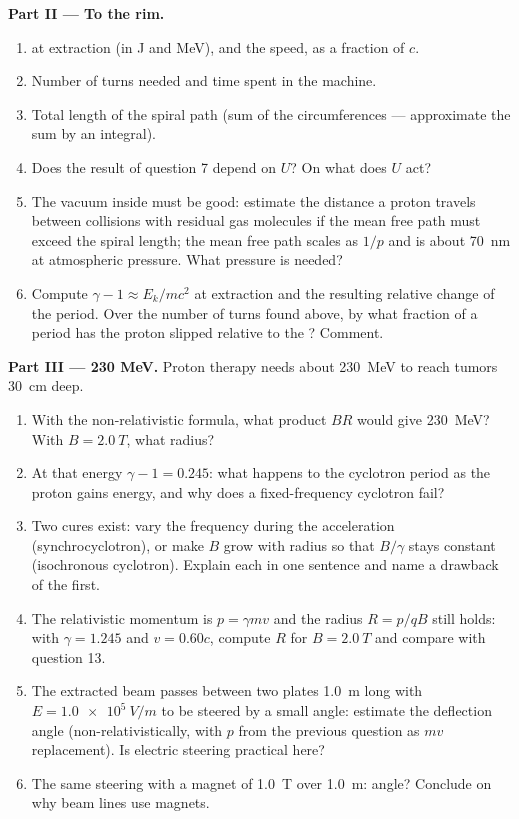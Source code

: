 \begin{problem}
\medskip
\noindent\textbf{Part II --- To the rim.}
\begin{enumerate}[resume]
  \item {} at extraction (in J and MeV), and the speed, as a
        fraction of $c$.
  \item Number of turns needed and time spent in the machine.
  \item Total length of the spiral path (sum of the circumferences ---
        approximate the sum by an integral).
  \item Does the result of question 7 depend on $U$? On what does $U$
        act?
  \item The vacuum inside must be good: estimate the distance a proton
        travels between collisions with residual gas molecules if the
        mean free path must exceed the spiral length; the mean free path
        scales as $1/p$ and is about \qty{70}{nm} at atmospheric
        pressure. What pressure is needed?
  \item Compute $\gamma - 1 \approx E_k/mc^2$ at extraction and the
        resulting relative change of the period. Over the number of
        turns found above, by what fraction of a period has the proton
        slipped relative to the ? Comment.
\end{enumerate}

\medskip
\noindent\textbf{Part III --- 230 MeV.}
Proton therapy needs about \qty{230}{MeV} to reach tumors \qty{30}{cm}
deep.
\begin{enumerate}[resume]
  \item With the non-relativistic formula, what product $BR$ would give
        \qty{230}{MeV}? With $B = \qty{2.0}{T}$, what radius?
  \item At that energy $\gamma - 1 = 0.245$: what happens to the
        cyclotron period as the proton gains energy, and why does a
        fixed-frequency cyclotron fail?
  \item Two cures exist: vary the  frequency during the
        acceleration (synchrocyclotron), or make $B$ grow with radius so
        that $B/\gamma$ stays constant (isochronous cyclotron). Explain
        each in one sentence and name a drawback of the first.
  \item The relativistic momentum is $p = \gamma mv$ and the radius $R =
        p/qB$ still holds: with $\gamma = 1.245$ and $v = 0.60c$, compute
        $R$ for $B = \qty{2.0}{T}$ and compare with question 13.
  \item The extracted beam passes between two plates \qty{1.0}{m} long
        with $E = \qty{1.0e5}{V/m}$ to be steered by a small angle:
        estimate the deflection angle (non-relativistically, with $p$
        from the previous question as $mv$ replacement). Is electric
        steering practical here?
  \item The same steering with a magnet of \qty{1.0}{T} over \qty{1.0}{m}:
        angle? Conclude on why beam lines use magnets.
\end{enumerate}


\end{problem}
